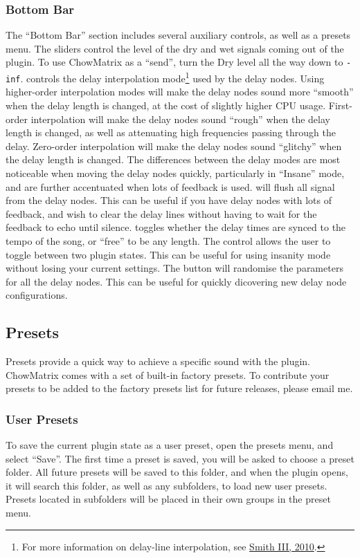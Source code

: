 \documentclass[landscape,twocolumn,a5paper]{manual}
\begin{document}
\subsubsection{Bottom Bar}
The ``Bottom Bar'' section includes several auxiliary controls,
as well as a presets menu.
\newpar
The  sliders control the level of the dry
and wet signals coming out of the plugin. To use ChowMatrix as
a ``send'', turn the Dry level all the way down to \texttt{-inf}.
\newpar
{} controls the delay interpolation
mode\footnote{For more information on delay-line interpolation, see \href{https://ccrma.stanford.edu/~jos/pasp/Delay_Line_Signal_Interpolation.html}{Smith III, 2010}.}
used by the delay nodes. Using higher-order interpolation modes
will make the delay nodes sound more ``smooth'' when the delay
length is changed, at the cost of slightly higher CPU usage.
First-order interpolation will make the delay nodes sound ``rough''
when the delay length is changed, as well as attenuating high
frequencies passing through the delay. Zero-order interpolation
will make the delay nodes sound  ``glitchy'' when the delay length
is changed. The differences between the delay modes are most noticeable
when moving the delay nodes quickly, particularly in ``Insane'' mode,
and are further accentuated when lots of feedback is used.
\newpar
{} will flush all signal from the delay nodes.
This can be useful if you have delay nodes with lots of feedback,
and wish to clear the delay lines without having to wait for
the feedback to echo until silence.
\newpar
{} toggles whether the delay times are synced
to the tempo of the song, or ``free'' to be any length.
\newpar
The  control allows the user to toggle
between two plugin states. This can be useful for using
insanity mode without losing your current settings.
\newpar
The  button will randomise the parameters
for all the delay nodes. This can be useful for quickly
dicovering new delay node configurations.

\subsection{Presets}
Presets provide a quick way to achieve a specific sound
with the plugin. ChowMatrix comes with a set of built-in
factory presets. To contribute your presets to be added
to the factory presets list for future releases, please
email me.

\subsubsection{User Presets}
To save the current plugin state as a user preset, open
the presets menu, and select ``Save''. The first time a
preset is saved, you will be asked to choose a preset
folder. All future presets will be saved to this folder,
and when the plugin opens, it will search this folder, as
well as any subfolders, to load new user presets.
Presets located in subfolders will be placed in their
own groups in the preset menu.
\newline\newline
\end{document}
